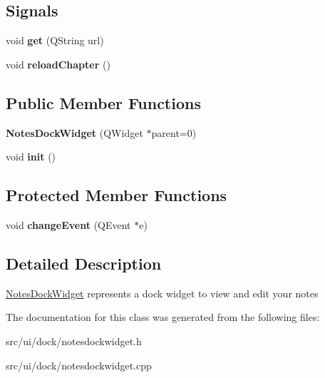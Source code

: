 \subsection*{Signals}
\begin{DoxyCompactItemize}
\item 
\hypertarget{classNotesDockWidget_a875103bf5e76b467a28ea4f83bda17c3}{
void {\bfseries get} (QString url)}
\label{classNotesDockWidget_a875103bf5e76b467a28ea4f83bda17c3}

\item 
\hypertarget{classNotesDockWidget_aa9d5e62de605aeecc7a7de51477b7799}{
void {\bfseries reloadChapter} ()}
\label{classNotesDockWidget_aa9d5e62de605aeecc7a7de51477b7799}

\end{DoxyCompactItemize}
\subsection*{Public Member Functions}
\begin{DoxyCompactItemize}
\item 
\hypertarget{classNotesDockWidget_ae071c4f04fd002debdb8a4eb0f9a942b}{
{\bfseries NotesDockWidget} (QWidget $\ast$parent=0)}
\label{classNotesDockWidget_ae071c4f04fd002debdb8a4eb0f9a942b}

\item 
\hypertarget{classNotesDockWidget_a5620a40403bce0a7f22f989569d94665}{
void {\bfseries init} ()}
\label{classNotesDockWidget_a5620a40403bce0a7f22f989569d94665}

\end{DoxyCompactItemize}
\subsection*{Protected Member Functions}
\begin{DoxyCompactItemize}
\item 
\hypertarget{classNotesDockWidget_a09c4538f7d6025b8a97de365acea2a6a}{
void {\bfseries changeEvent} (QEvent $\ast$e)}
\label{classNotesDockWidget_a09c4538f7d6025b8a97de365acea2a6a}

\end{DoxyCompactItemize}


\subsection{Detailed Description}
\hyperlink{classNotesDockWidget}{NotesDockWidget} represents a dock widget to view and edit your notes 

The documentation for this class was generated from the following files:\begin{DoxyCompactItemize}
\item 
src/ui/dock/notesdockwidget.h\item 
src/ui/dock/notesdockwidget.cpp\end{DoxyCompactItemize}
